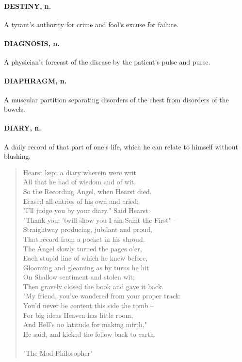 \documentclass[11pt]{article}
\begin{document}
\paragraph{DESTINY, n.}  A tyrant's authority for crime and fool's excuse for
failure.

\paragraph{DIAGNOSIS, n.}  A physician's forecast of the disease by the patient's
pulse and purse.

\paragraph{DIAPHRAGM, n.}  A muscular partition separating disorders of the chest
from disorders of the bowels.

\paragraph{DIARY, n.}  A daily record of that part of one's life, which he can
relate to himself without blushing.

\begin{quote}   Hearst kept a diary wherein were writ \\
  All that he had of wisdom and of wit. \\
  So the Recording Angel, when Hearst died, \\
  Erased all entries of his own and cried: \\
  "I'll judge you by your diary."  Said Hearst: \\
  "Thank you; 'twill show you I am Saint the First" -- \\
  Straightway producing, jubilant and proud, \\
  That record from a pocket in his shroud. \\
  The Angel slowly turned the pages o'er, \\
  Each stupid line of which he knew before, \\
  Glooming and gleaming as by turns he hit \\
  On Shallow sentiment and stolen wit; \\
  Then gravely closed the book and gave it back. \\
  "My friend, you've wandered from your proper track: \\
  You'd never be content this side the tomb -- \\
  For big ideas Heaven has little room, \\
  And Hell's no latitude for making mirth," \\
  He said, and kicked the fellow back to earth. \\
 \\
"The Mad Philosopher" \end{quote}
\end{document}
